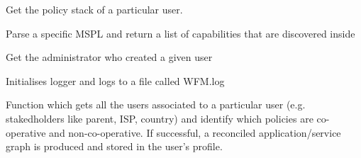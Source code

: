 \documentclass[letterpaper,10pt,oneside]{sphinxmanual}
\begin{document}
\begin{fulllineitems}
\begin{fulllineitems}
\end{fulllineitems}


\begin{fulllineitems}
\label{online_workflow_manager:online_workflow_manager.WorkflowManager.get_PolicyStack}
Get the policy stack of a particular user.

\end{fulllineitems}


\begin{fulllineitems}
\label{online_workflow_manager:online_workflow_manager.WorkflowManager.get_capability_from_mspl}
Parse a specific MSPL and return a list of capabilities
that are discovered inside

\end{fulllineitems}


\begin{fulllineitems}
\label{online_workflow_manager:online_workflow_manager.WorkflowManager.get_creator}
Get the administrator who created a given user

\end{fulllineitems}


\begin{fulllineitems}
\label{online_workflow_manager:online_workflow_manager.WorkflowManager.init_log}
Initialises logger and logs to a file called WFM.log

\end{fulllineitems}


\begin{fulllineitems}
\label{online_workflow_manager:online_workflow_manager.WorkflowManager.reconcile}
Function which gets all the users associated to a particular user
(e.g. stakedholders like parent, ISP, country) and identify
which policies are co-operative and non-co-operative.
If successful, a reconciled application/service graph is produced
and stored in the user's profile.


\end{fulllineitems}
\end{fulllineitems}
\end{document}
